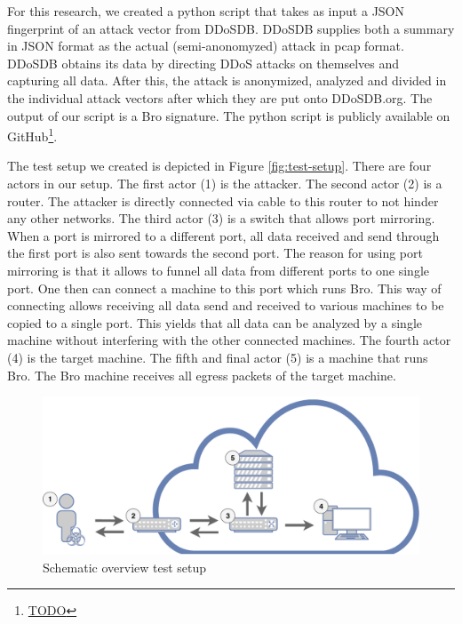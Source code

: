 For this research, we created a python script that takes as input a JSON fingerprint of an attack vector from DDoSDB. DDoSDB supplies both a summary in JSON format as the actual (semi-anonomyzed) attack in pcap format. DDoSDB obtains its data by directing DDoS attacks on themselves and capturing all data. After this, the attack is anonymized, analyzed and divided in the individual attack vectors after which they are put onto DDoSDB.org. The output of our script is a Bro signature. The python script is publicly available on GitHub\footnote{\url{TODO}}. 

The test setup we created is depicted in Figure \ref{fig:test-setup}. There are four actors in our setup. The first actor (1) is the attacker. The second actor (2) is a router. The attacker is directly connected via cable to this router to not hinder any other networks. The third actor (3) is a switch that allows port mirroring. When a port is mirrored to a different port, all data received and send through the first port is also sent towards the second port. The reason for using port mirroring is that it allows to funnel all data from different ports to one single port. One then can connect a machine to this port which runs Bro. This way of connecting allows receiving all data send and received to various machines to be copied to a single port. This yields that all data can be analyzed by a single machine without interfering with the other connected machines. The fourth actor (4) is the target machine. The fifth and final actor (5) is a machine that runs Bro. The Bro machine receives all egress packets of the target machine. 


\begin{figure}[H]
\centering
\includegraphics[width=\textwidth]{./images/test-setup.pdf}
\caption{Schematic overview test setup}
\end{figure}\label{fig:test-setup}

